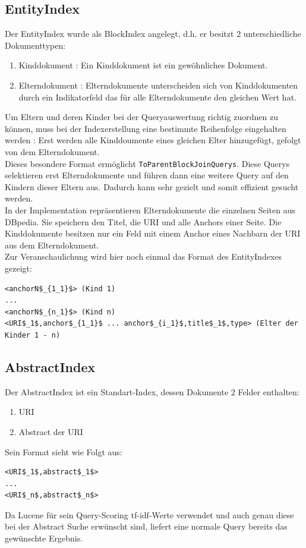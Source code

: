 \documentclass[11pt, a4paper, oneside]{Thesis} %
\begin{document}
\subsection{EntityIndex}
Der EntityIndex wurde als BlockIndex angelegt, d.h. er besitzt 2 unterschiedliche Dokumenttypen:
\begin{enumerate}
\item Kinddokument : Ein Kinddokument ist ein gew\"ohnliches Dokument.
\item Elterndokument : Elterndokumente unterscheiden sich von Kinddokumenten durch ein Indikatorfeld das f\"ur alle Elterndokumente den gleichen Wert hat.
\end{enumerate}
Um Eltern und deren Kinder bei der Queryauswertung richtig zuordnen zu k\"onnen, muss bei der Indexerstellung eine bestimmte Reihenfolge eingehalten werden : Erst werden alle Kinddoumente eines gleichen Elter hinzugef\"ugt, gefolgt von dem Elterndokument.\\
Dieses besondere Format erm\"oglicht \texttt{ToParentBlockJoinQuerys}. Diese Querys selektieren erst Elterndokumente und f\"uhren dann eine weitere Query auf den Kindern dieser Eltern aus. Dadurch kann sehr gezielt und somit effizient gesucht werden.\\
In der Implementation repr\"asentieren Elterndokumente die einzelnen Seiten aus DBpedia. Sie speichern den Titel, die URI und alle Anchors einer Seite. Die Kinddokumente  besitzen nur ein Feld mit einem Anchor eines Nachbarn der URI aus dem Elterndokument.\\
Zur Veranschaulichung wird hier noch einmal das Format des EntityIndexes gezeigt:
\begin{lstlisting}
<anchorN$_{1_1}$> (Kind 1)
...
<anchorN$_{n_1}$> (Kind n)
<URI$_1$,anchor$_{1_1}$ ... anchor$_{i_1}$,title$_1$,type> (Elter der Kinder 1 - n) 
\end{lstlisting}
\subsection{AbstractIndex}
Der AbstractIndex ist ein Standart-Index, dessen Dokumente 2 Felder enthalten:
\begin{enumerate}
\item URI
\item Abstract der URI
\end{enumerate}
Sein Format sieht wie Folgt aus:
\begin{lstlisting}
<URI$_1$,abstract$_1$>
...
<URI$_n$,abstract$_n$>
\end{lstlisting}
Da Lucene f\"ur sein Query-Scoring tf-idf-Werte verwendet und auch genau diese bei der Abstract Suche erw\"unscht sind, liefert eine normale Query bereits das gew\"unschte Ergebnis.
\end{document}
